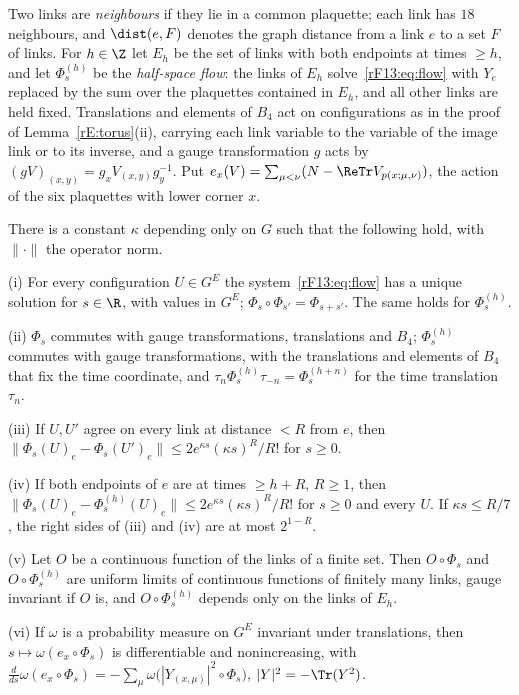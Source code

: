 Two links are \emph{neighbours} if they lie in a common plaquette; each link
has $18$ neighbours, and $\dist(e,F)$ denotes the graph distance from a link
$e$ to a set $F$ of links. For $h\in\Z$ let $E_h$ be the set of links with
both endpoints at times $\ge h$, and let $\Phi^{(h)}_s$ be the
\emph{half-space flow}: the links of $E_h$ solve~\eqref{rF13:eq:flow} with
$Y_e$ replaced by the sum over the plaquettes contained in $E_h$, and all
other links are held fixed. Translations and elements of $B_4$ act on
configurations as in the proof of Lemma~\ref{rE:torus}(ii), carrying each
link variable to the variable of the image link or to its inverse, and a
gauge transformation $g$ acts by $(gV)_{(x,y)}=g_xV_{(x,y)}g_y^{-1}$. Put
$e_x(V)=\sum_{\mu<\nu}(N-\ReTr V_{p(x;\mu,\nu)})$, the action of the six
plaquettes with lower corner $x$.

\begin{lemma}\label{rF13:flow}
There is a constant $\kappa$ depending only on $G$ such that the following
hold, with $\|\cdot\|$ the operator norm.

\textup{(i)} For every configuration $U\in G^E$ the system~\eqref{rF13:eq:flow}
has a unique solution for $s\in\R$, with values in $G^E$; $\Phi_s\circ
\Phi_{s'}=\Phi_{s+s'}$. The same holds for $\Phi^{(h)}_s$.

\textup{(ii)} $\Phi_s$ commutes with gauge transformations, translations and
$B_4$; $\Phi^{(h)}_s$ commutes with gauge transformations, with the
translations and elements of $B_4$ that fix the time coordinate, and
$\tau_n\Phi^{(h)}_s\tau_{-n}=\Phi^{(h+n)}_s$ for the time translation $\tau_n$.

\textup{(iii)} If $U,U'$ agree on every link at distance $<R$ from $e$, then
$\|\Phi_s(U)_e-\Phi_s(U')_e\|\le2e^{\kappa s}(\kappa s)^R/R!$ for $s\ge0$.

\textup{(iv)} If both endpoints of $e$ are at times $\ge h+R$, $R\ge1$,
then $\|\Phi_s(U)_e-\Phi^{(h)}_s(U)_e\|\le2e^{\kappa s}(\kappa s)^R/R!$
for $s\ge0$ and every $U$. If $\kappa s\le R/7$, the right sides of
\textup{(iii)} and \textup{(iv)} are at most $2^{1-R}$.

\textup{(v)} Let $O$ be a continuous function of the links of a finite set.
Then $O\circ\Phi_s$ and $O\circ\Phi^{(h)}_s$ are uniform limits of
continuous functions of finitely many links, gauge invariant if $O$ is, and
$O\circ\Phi^{(h)}_s$ depends only on the links of $E_h$.

\textup{(vi)} If $\omega$ is a probability measure on $G^E$ invariant under
translations, then $s\mapsto\omega(e_x\circ\Phi_s)$ is differentiable and
nonincreasing, with $\frac d{ds}\omega(e_x\circ\Phi_s)=-\sum_\mu\omega\bigl(
|Y_{(x,\mu)}|^2\circ\Phi_s\bigr)$, $|Y|^2=-\Tr(Y^2)$.
\end{lemma}

